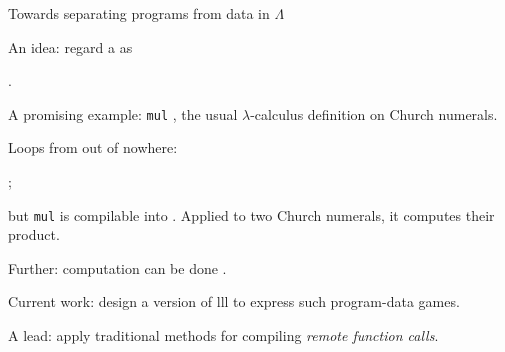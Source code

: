 \documentclass[12pt,fleqn,landscape]{article}
\begin{document}

\begin{slide}{Towards separating programs from data in $\Lambda$}


\be

\item An idea: regard a  as 

\hfill {}.
\vair

\item A promising example: {\tt mul} , the usual $\lambda$-calculus definition on Church numerals. 
\vair

\item Loops from out of nowhere:
\bi
\item {}; 
\vair

\item but  {\tt mul} is compilable into . Applied to two Church numerals, it  computes their product.
\vair

\item Further: computation can be done .
\ei
\vair

\item Current work: design a  version of {\sc lll} to express such program-data games. 
\vair

A  lead: apply traditional methods for compiling  {\em remote function calls}.

\ee






\end{slide}



\end{document}
